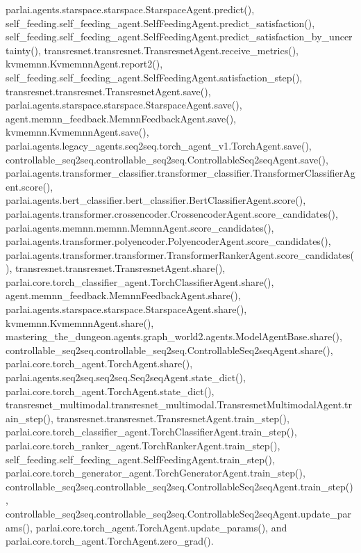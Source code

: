 parlai.\+agents.\+starspace.\+starspace.\+Starspace\+Agent.\+predict(), self\+\_\+feeding.\+self\+\_\+feeding\+\_\+agent.\+Self\+Feeding\+Agent.\+predict\+\_\+satisfaction(), self\+\_\+feeding.\+self\+\_\+feeding\+\_\+agent.\+Self\+Feeding\+Agent.\+predict\+\_\+satisfaction\+\_\+by\+\_\+uncertainty(), transresnet.\+transresnet.\+Transresnet\+Agent.\+receive\+\_\+metrics(), kvmemnn.\+Kvmemnn\+Agent.\+report2(), self\+\_\+feeding.\+self\+\_\+feeding\+\_\+agent.\+Self\+Feeding\+Agent.\+satisfaction\+\_\+step(), transresnet.\+transresnet.\+Transresnet\+Agent.\+save(), parlai.\+agents.\+starspace.\+starspace.\+Starspace\+Agent.\+save(), agent.\+memnn\+\_\+feedback.\+Memnn\+Feedback\+Agent.\+save(), kvmemnn.\+Kvmemnn\+Agent.\+save(), parlai.\+agents.\+legacy\+\_\+agents.\+seq2seq.\+torch\+\_\+agent\+\_\+v1.\+Torch\+Agent.\+save(), controllable\+\_\+seq2seq.\+controllable\+\_\+seq2seq.\+Controllable\+Seq2seq\+Agent.\+save(), parlai.\+agents.\+transformer\+\_\+classifier.\+transformer\+\_\+classifier.\+Transformer\+Classifier\+Agent.\+score(), parlai.\+agents.\+bert\+\_\+classifier.\+bert\+\_\+classifier.\+Bert\+Classifier\+Agent.\+score(), parlai.\+agents.\+transformer.\+crossencoder.\+Crossencoder\+Agent.\+score\+\_\+candidates(), parlai.\+agents.\+memnn.\+memnn.\+Memnn\+Agent.\+score\+\_\+candidates(), parlai.\+agents.\+transformer.\+polyencoder.\+Polyencoder\+Agent.\+score\+\_\+candidates(), parlai.\+agents.\+transformer.\+transformer.\+Transformer\+Ranker\+Agent.\+score\+\_\+candidates(), transresnet.\+transresnet.\+Transresnet\+Agent.\+share(), parlai.\+core.\+torch\+\_\+classifier\+\_\+agent.\+Torch\+Classifier\+Agent.\+share(), agent.\+memnn\+\_\+feedback.\+Memnn\+Feedback\+Agent.\+share(), parlai.\+agents.\+starspace.\+starspace.\+Starspace\+Agent.\+share(), kvmemnn.\+Kvmemnn\+Agent.\+share(), mastering\+\_\+the\+\_\+dungeon.\+agents.\+graph\+\_\+world2.\+agents.\+Model\+Agent\+Base.\+share(), controllable\+\_\+seq2seq.\+controllable\+\_\+seq2seq.\+Controllable\+Seq2seq\+Agent.\+share(), parlai.\+core.\+torch\+\_\+agent.\+Torch\+Agent.\+share(), parlai.\+agents.\+seq2seq.\+seq2seq.\+Seq2seq\+Agent.\+state\+\_\+dict(), parlai.\+core.\+torch\+\_\+agent.\+Torch\+Agent.\+state\+\_\+dict(), transresnet\+\_\+multimodal.\+transresnet\+\_\+multimodal.\+Transresnet\+Multimodal\+Agent.\+train\+\_\+step(), transresnet.\+transresnet.\+Transresnet\+Agent.\+train\+\_\+step(), parlai.\+core.\+torch\+\_\+classifier\+\_\+agent.\+Torch\+Classifier\+Agent.\+train\+\_\+step(), parlai.\+core.\+torch\+\_\+ranker\+\_\+agent.\+Torch\+Ranker\+Agent.\+train\+\_\+step(), self\+\_\+feeding.\+self\+\_\+feeding\+\_\+agent.\+Self\+Feeding\+Agent.\+train\+\_\+step(), parlai.\+core.\+torch\+\_\+generator\+\_\+agent.\+Torch\+Generator\+Agent.\+train\+\_\+step(), controllable\+\_\+seq2seq.\+controllable\+\_\+seq2seq.\+Controllable\+Seq2seq\+Agent.\+train\+\_\+step(), controllable\+\_\+seq2seq.\+controllable\+\_\+seq2seq.\+Controllable\+Seq2seq\+Agent.\+update\+\_\+params(), parlai.\+core.\+torch\+\_\+agent.\+Torch\+Agent.\+update\+\_\+params(), and parlai.\+core.\+torch\+\_\+agent.\+Torch\+Agent.\+zero\+\_\+grad().

